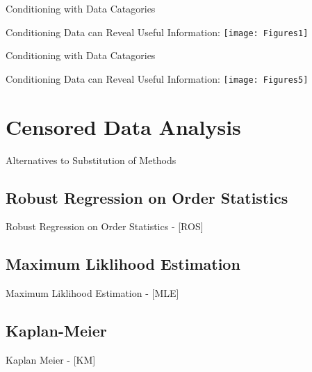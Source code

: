 \documentclass{beamer}
\begin{document}
\begin{frame}{Conditioning with Data Catagories}
\begin{center}
Conditioning Data can Reveal Useful Information:
\texttt{[image: Figures1]}
\end{center}

\end{frame}


\begin{frame}{Conditioning with Data Catagories}
\begin{center}
Conditioning Data can Reveal Useful Information:
\texttt{[image: Figures5]}

\end{center}
\end{frame}

\section{Censored Data Analysis}
\begin{frame}{Alternatives to Substitution of Methods}


\end{frame}

\subsection{Robust Regression on Order Statistics}

\begin{frame}{Robust Regression on Order Statistics - [ROS] }

\end{frame}


\subsection{Maximum Liklihood Estimation}

\begin{frame}{Maximum Liklihood Estimation - [MLE] }

\end{frame}


\subsection{Kaplan-Meier}

\begin{frame}{Kaplan Meier - [KM] }

\end{frame}
\end{document}
